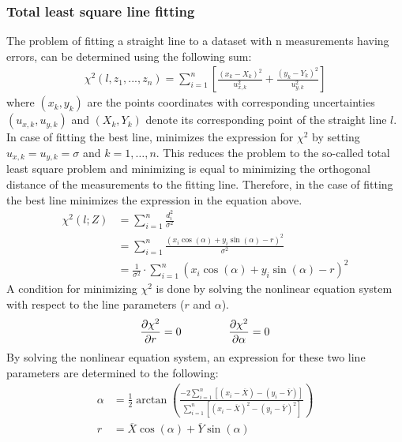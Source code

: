 \documentclass[../Head/Main.tex]{subfiles}
\begin{document}
\subsubsection{Total least square line fitting}
The problem of fitting a straight line to a dataset with n measurements having errors, can be determined using the following sum:
\begin{align}
    \chi^2\left(l, z_1, ..., z_n\right) = \sum_{i = 1}^{n} \left[\frac{\left(x_k - X_k\right)^2}{u_{x, k}^{2}} + \frac{\left(y_k - Y_k\right)^2}{u_{y, k}^{2}}\right]
\end{align}
where $\left(x_k,y_k\right)$ are the points coordinates with corresponding uncertainties $\left(u_{x, k},u_{y, k}\right)$ and $(X_k,Y_k)$ denote its corresponding point of the straight line $l$. In case of fitting the best line, minimizes the expression for $\chi^2$ by setting $u_{x, k} = u_{y, k} = \sigma$ and $k = 1, …, n$. This reduces the problem to the so-called total least square problem and minimizing is equal to minimizing the orthogonal distance of the measurements to the fitting line. Therefore, in the case of fitting the best line minimizes the expression in the equation above.
\begin{align}
    \chi^2\left(l; Z\right) &= \sum_{i = 1}^{n} \frac{d_i^2}{\sigma^2} \\
    &= \sum_{i = 1}^{n}\frac{\left(x_i\cos(\alpha) + y_i\sin⁡(\alpha)-r\right)^2}{\sigma^2}\\
    &= \frac{1}{\sigma^2}\cdot\sum_{i = 1}^{n}\left(x_i\cos(\alpha) + y_i\sin⁡(\alpha)-r\right)^2
\end{align}
A condition for minimizing $\chi^2$ is done by solving the nonlinear equation system with respect to the line parameters ($r$ and $\alpha$). 
\begin{align}
    \frac{\partial\chi^2}{\partial r} = 0 \hspace{1.5cm} \frac{\partial\chi^2}{\partial\alpha} = 0
\end{align}
By solving the nonlinear equation system, an expression for these two line parameters are determined to the following:
\begin{align}
    \alpha &= \frac{1}{2}\arctan\left(\frac{-2\sum_{i=1}^{n}\left[\left(x_i-\overline{X}\right) - \left(y_i-\overline{Y}\right)\right]}{\sum_{i = 1}^{n}\left[\left(x_i-\overline{X}\right)^2 - \left(y_i-\overline{Y}\right)^2\right]}\right) \\
    r &= \overline{X}\cos(\alpha)+\overline{Y}\sin(\alpha)
\end{align}
\end{document}
